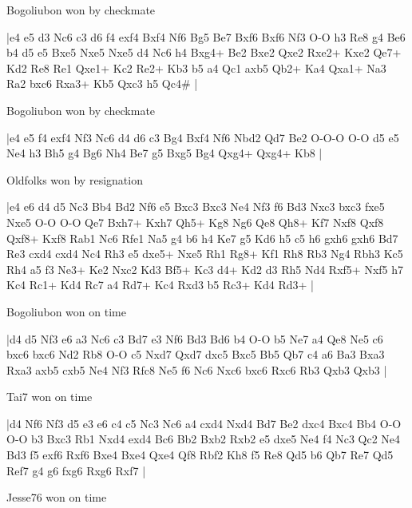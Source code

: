 \showboard

Bogoliubon won by checkmate

\makegametitle
|e4 e5 d3 Nc6 c3 d6 f4 exf4 Bxf4 Nf6 Bg5 Be7 Bxf6 Bxf6 Nf3 O-O h3 Re8 g4 Be6 b4 d5 e5 Bxe5 Nxe5 Nxe5 d4 Nc6 h4 Bxg4+ Be2 Bxe2 Qxe2 Rxe2+ Kxe2 Qe7+ Kd2 Re8 Re1 Qxe1+ Kc2 Re2+ Kb3 b5 a4 Qc1 axb5 Qb2+ Ka4 Qxa1+ Na3 Ra2 bxc6 Rxa3+ Kb5 Qxc3 h5 Qc4\#  |

\showboard

Bogoliubon won by checkmate

\makegametitle
|e4 e5 f4 exf4 Nf3 Nc6 d4 d6 c3 Bg4 Bxf4 Nf6 Nbd2 Qd7 Be2 O-O-O O-O d5 e5 Ne4 h3 Bh5 g4 Bg6 Nh4 Be7 g5 Bxg5 Bg4 Qxg4+ Qxg4+ Kb8  |

\showboard

Oldfolks won by resignation

\makegametitle
|e4 e6 d4 d5 Nc3 Bb4 Bd2 Nf6 e5 Bxc3 Bxc3 Ne4 Nf3 f6 Bd3 Nxc3 bxc3 fxe5 Nxe5 O-O O-O Qe7 Bxh7+ Kxh7 Qh5+ Kg8 Ng6 Qe8 Qh8+ Kf7 Nxf8 Qxf8 Qxf8+ Kxf8 Rab1 Nc6 Rfe1 Na5 g4 b6 h4 Ke7 g5 Kd6 h5 c5 h6 gxh6 gxh6 Bd7 Re3 cxd4 cxd4 Nc4 Rh3 e5 dxe5+ Nxe5 Rh1 Rg8+ Kf1 Rh8 Rb3 Ng4 Rbh3 Kc5 Rh4 a5 f3 Ne3+ Ke2 Nxc2 Kd3 Bf5+ Kc3 d4+ Kd2 d3 Rh5 Nd4 Rxf5+ Nxf5 h7 Kc4 Rc1+ Kd4 Rc7 a4 Rd7+ Kc4 Rxd3 b5 Rc3+ Kd4 Rd3+  |

\showboard

Bogoliubon won on time

\makegametitle
|d4 d5 Nf3 e6 a3 Nc6 c3 Bd7 e3 Nf6 Bd3 Bd6 b4 O-O b5 Ne7 a4 Qe8 Ne5 c6 bxc6 bxc6 Nd2 Rb8 O-O c5 Nxd7 Qxd7 dxc5 Bxc5 Bb5 Qb7 c4 a6 Ba3 Bxa3 Rxa3 axb5 cxb5 Ne4 Nf3 Rfc8 Ne5 f6 Nc6 Nxc6 bxc6 Rxc6 Rb3 Qxb3 Qxb3  |

\showboard

Tai7 won on time

\makegametitle
|d4 Nf6 Nf3 d5 e3 e6 c4 c5 Nc3 Nc6 a4 cxd4 Nxd4 Bd7 Be2 dxc4 Bxc4 Bb4 O-O O-O b3 Bxc3 Rb1 Nxd4 exd4 Bc6 Bb2 Bxb2 Rxb2 e5 dxe5 Ne4 f4 Nc3 Qc2 Ne4 Bd3 f5 exf6 Rxf6 Bxe4 Bxe4 Qxe4 Qf8 Rbf2 Kh8 f5 Re8 Qd5 b6 Qb7 Re7 Qd5 Ref7 g4 g6 fxg6 Rxg6 Rxf7  |

\showboard

Jesse76 won on time

